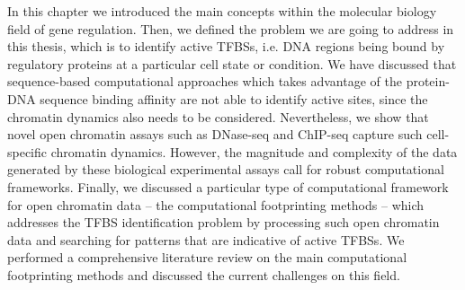 In this chapter we introduced the main concepts within the molecular biology field of gene regulation. Then, we defined the problem we are going to address in this thesis, which is to identify active TFBSs, i.e. DNA regions being bound by regulatory proteins at a particular cell state or condition. We have discussed that sequence-based computational approaches which takes advantage of the protein-DNA sequence binding affinity are not able to identify active sites, since the chromatin dynamics also needs to be considered. Nevertheless, we show that novel open chromatin assays such as DNase-seq and ChIP-seq capture such cell-specific chromatin dynamics. However, the magnitude and complexity of the data generated by these biological experimental assays call for robust computational frameworks. Finally, we discussed a particular type of computational framework for open chromatin data -- the computational footprinting methods -- which addresses the TFBS identification problem by processing such open chromatin data and searching for patterns that are indicative of active TFBSs. We performed a comprehensive literature review on the main computational footprinting methods and discussed the current challenges on this field.

